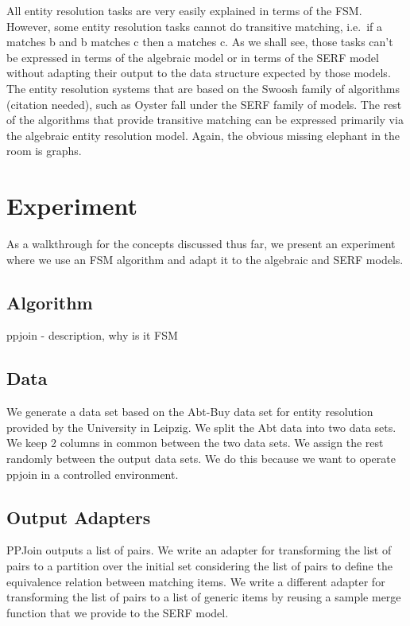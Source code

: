 \documentclass[11pt]{article}
\begin{document}
    All entity resolution tasks are very easily explained in terms of the FSM\@. However, some entity resolution tasks cannot do transitive matching, i.e.\ if a matches b and b matches c then a matches c. 
    As we shall see, those tasks can't be expressed in terms of the algebraic model or in terms of the SERF model without adapting their output to the data structure expected by those models. The entity resolution systems that are based on the Swoosh family of algorithms (citation needed), such as Oyster fall under the SERF family of models. The rest of the algorithms that provide transitive matching can be expressed primarily via the algebraic entity resolution model. Again, the obvious missing elephant in the room is graphs.

    \section{Experiment}\label{section:experiment}

    As a walkthrough for the concepts discussed thus far, we present an experiment where we use an FSM algorithm and adapt it to the algebraic and SERF models.

    \subsection[algo]{Algorithm}\label{subsec:algorithm}
    
    ppjoin - description, why is it FSM

    \subsection[data]{Data}\label{subsec:data}
    
    We generate a data set based on the Abt-Buy data set for entity resolution provided by the University in Leipzig. We split the Abt data into two data sets. We keep 2 columns in common between the two data sets. We assign the rest randomly between the output data sets. We do this because we want to operate ppjoin in a controlled environment.

    \subsection[adapters]{Output Adapters}\label{subsec:adapters}

    PPJoin outputs a list of pairs. We write an adapter for transforming the list of pairs to a partition over the initial set considering the list of pairs to define the equivalence relation between matching items. We write a different adapter for transforming the list of pairs to a list of generic items by reusing a sample merge function that we provide to the SERF model.
\end{document}

